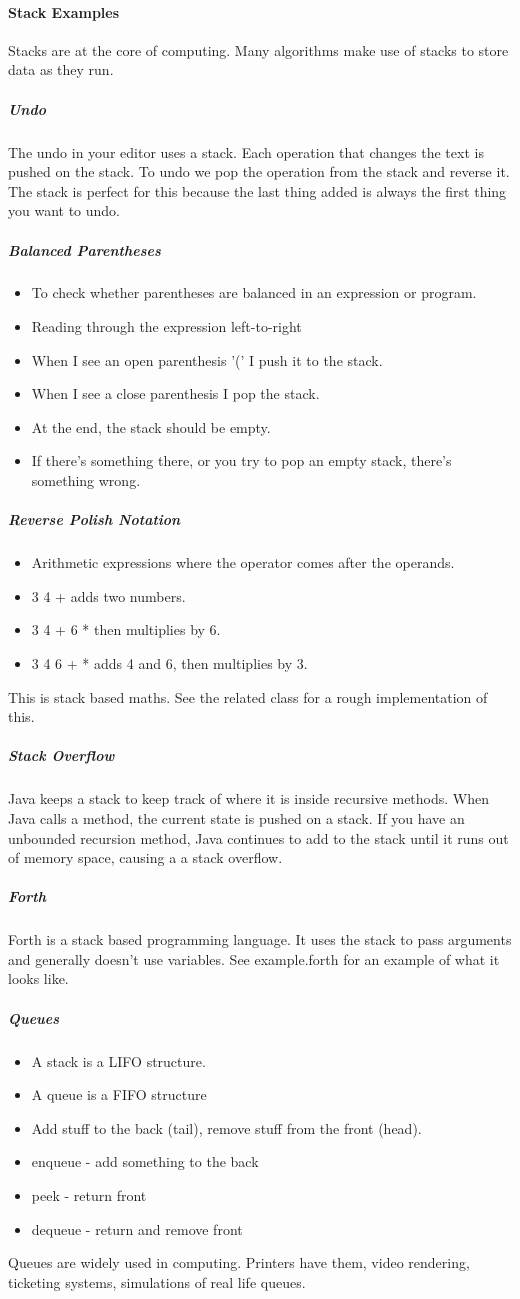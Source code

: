 \documentclass[10pt,a4paper]{article}
\begin{document}
\paragraph{Stack Examples}
Stacks are at the core of computing. Many algorithms make use of stacks to store data as they run.
\subparagraph{Undo}
The undo in your editor uses a stack. Each operation that changes the text is pushed on the stack. To undo we pop the operation from the stack and reverse it. The stack is perfect for this because the last thing added is always the first thing you want to undo.
\subparagraph{Balanced Parentheses}
\begin{itemize}
\item To check whether parentheses are balanced in an expression or program.
\item Reading through the expression left-to-right
\item When I see an open parenthesis '(' I push it to the stack.
\item When I see a close parenthesis I pop the stack.
\item At the end, the stack should be empty.
\item If there's something there, or you try to pop an empty stack, there's something wrong.
\end{itemize}
\subparagraph{Reverse Polish Notation}
\begin{itemize}
\item Arithmetic expressions where the operator comes after the operands.
\item 3 4 + adds two numbers.
\item 3 4 + 6 * then multiplies by 6.
\item 3 4 6 + * adds 4 and 6, then multiplies by 3.
\end{itemize}
This is stack based maths. See the related class for a rough implementation of this.
\subparagraph{Stack Overflow}
Java keeps a stack to keep track of where it is inside recursive methods. When Java calls a method, the current state is pushed on a stack. If you have an unbounded recursion method, Java continues to add to the stack until it runs out of memory space, causing a a stack overflow.
\subparagraph{Forth}
Forth is a stack based programming language. It uses the stack to pass arguments and generally doesn't use variables. See example.forth for an example of what it looks like.
\subparagraph{Queues}
\begin{itemize}
\item A stack is a LIFO structure.
\item A queue is a FIFO structure
\item Add stuff to the back (tail), remove stuff from the front (head).
\item enqueue - add something to the back
\item peek - return front
\item dequeue - return and remove front
\end{itemize}
Queues are widely used in computing. Printers have them, video rendering, ticketing systems, simulations of real life queues.
\end{document}
